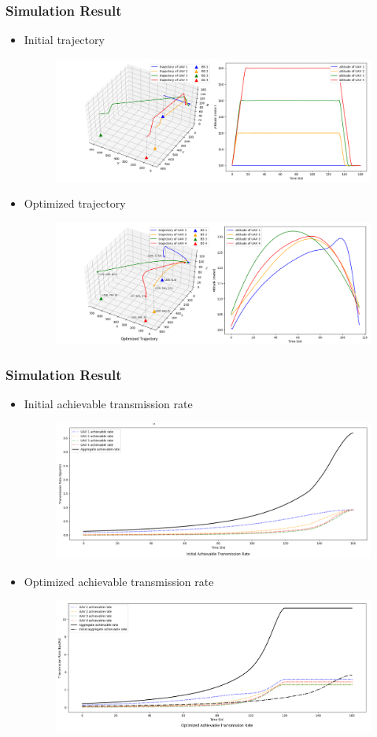 \documentclass[handout,11.5pt]{beamer}
\begin{document}
\begin{frame}
	\frametitle{Simulation Result}
	\begin{itemize}\itemsep-0.5em
		\item Initial trajectory
		\begin{figure}
			\includegraphics[width=.8\linewidth]{init_trajectory.png}
		\end{figure}
		\item Optimized trajectory
		\begin{figure}
			\includegraphics[width=.8\linewidth]{opt_trajectory.png}
		\end{figure}
	\end{itemize}
\end{frame}
\begin{frame}
	\frametitle{Simulation Result}
	\begin{itemize}\itemsep-0.5em
		\item Initial achievable transmission rate
		\begin{figure}
			\includegraphics[width=.7\linewidth]{init_rate.png}
		\end{figure}
		\item Optimized achievable transmission rate
		\begin{figure}
			\includegraphics[width=.7\linewidth]{opt_rate.png}
		\end{figure}
	\end{itemize}
\end{frame}
\end{document}
